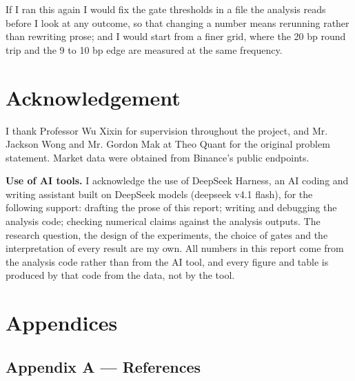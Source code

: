 \documentclass[11pt,a4paper]{article}
\begin{document}
If I ran this again I would fix the gate thresholds in a file the analysis reads before I look at any outcome, so that changing a number means rerunning rather than rewriting prose; and I would start from a finer grid, where the 20 bp round trip and the 9 to 10 bp edge are measured at the same frequency.

\bigskip

\section{Acknowledgement}

I thank Professor Wu Xixin for supervision throughout the project, and Mr. Jackson Wong and Mr. Gordon Mak at Theo Quant for the original problem statement. Market data were obtained from Binance's public endpoints.

\textbf{Use of AI tools.} I acknowledge the use of DeepSeek Harness, an AI coding and writing assistant built on DeepSeek models (deepseek v4.1 flash), for the following support: drafting the prose of this report; writing and debugging the analysis code; checking numerical claims against the analysis outputs. The research question, the design of the experiments, the choice of gates and the interpretation of every result are my own. All numbers in this report come from the analysis code rather than from the AI tool, and every figure and table is produced by that code from the data, not by the tool.

\bigskip

\section{Appendices}

\subsection*{Appendix A --- References}
\end{document}
